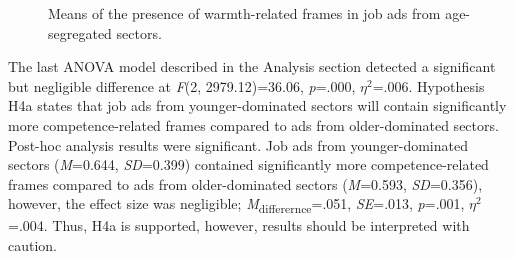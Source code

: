 \documentclass[jou]{apa7}
\begin{document}
\begin{figure*}
    \caption{Means of the presence of warmth-related frames in job ads from age-segregated sectors.}
    \label{figure3}
    \end{figure*}

The last ANOVA model described in the Analysis section detected a significant but negligible difference at \textit{F}(2, 2979.12)=36.06, \textit{p}=.000, \textit{$\eta^2$}=.006. Hypothesis H4a states that job ads from younger-dominated sectors will contain significantly more competence-related frames compared to ads from older-dominated sectors. Post-hoc analysis results were significant. Job ads from younger-dominated sectors (\textit{M}=0.644, \textit{SD}=0.399) contained significantly more competence-related frames compared to ads from older-dominated sectors (\textit{M}=0.593, \textit{SD}=0.356), however, the effect size was negligible; \textit{M}\textsubscript{differernce}=.051, \textit{SE}=.013, \textit{p}=.001, \textit{$\eta^2$}=.004. Thus, H4a is supported, however, results should be interpreted with caution.
\end{document}
